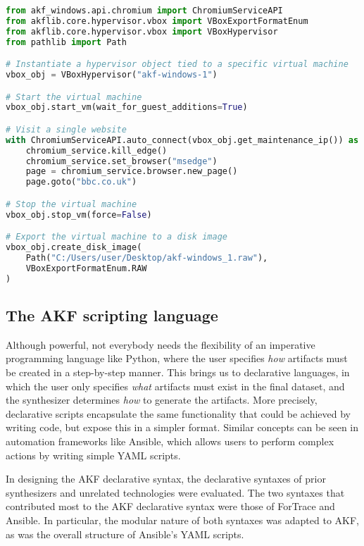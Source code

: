 \documentclass[preprint,12pt]{elsarticle}
\begin{document}
\begin{lstlisting}[label={lst:6.2a}, caption={Example of an imperative AKF scenario.}, language=Python]
from akf_windows.api.chromium import ChromiumServiceAPI
from akflib.core.hypervisor.vbox import VBoxExportFormatEnum
from akflib.core.hypervisor.vbox import VBoxHypervisor
from pathlib import Path

# Instantiate a hypervisor object tied to a specific virtual machine
vbox_obj = VBoxHypervisor("akf-windows-1")

# Start the virtual machine
vbox_obj.start_vm(wait_for_guest_additions=True)

# Visit a single website
with ChromiumServiceAPI.auto_connect(vbox_obj.get_maintenance_ip()) as chromium_service:
    chromium_service.kill_edge()
    chromium_service.set_browser("msedge")
    page = chromium_service.browser.new_page()
    page.goto("bbc.co.uk")

# Stop the virtual machine
vbox_obj.stop_vm(force=False)

# Export the virtual machine to a disk image
vbox_obj.create_disk_image(
    Path("C:/Users/user/Desktop/akf-windows_1.raw"),
    VBoxExportFormatEnum.RAW
)
\end{lstlisting}

\subsection{The AKF scripting
language}\label{the-akf-scripting-language}

Although powerful, not everybody needs the flexibility of an imperative
programming language like Python, where the user specifies \emph{how}
artifacts must be created in a step-by-step manner. This brings us to
declarative languages, in which the user only specifies \emph{what}
artifacts must exist in the final dataset, and the synthesizer
determines \emph{how} to generate the artifacts. More precisely,
declarative scripts encapsulate the same functionality that could be
achieved by writing code, but expose this in a simpler format. Similar
concepts can be seen in automation frameworks like Ansible, which allows
users to perform complex actions by writing simple YAML scripts.

In designing the AKF declarative syntax, the declarative syntaxes of
prior synthesizers and unrelated technologies were evaluated. The two
syntaxes that contributed most to the AKF declarative syntax were those
of ForTrace and Ansible. In particular, the modular nature of both
syntaxes was adapted to AKF, as was the overall structure of Ansible's
YAML scripts.
\end{document}
